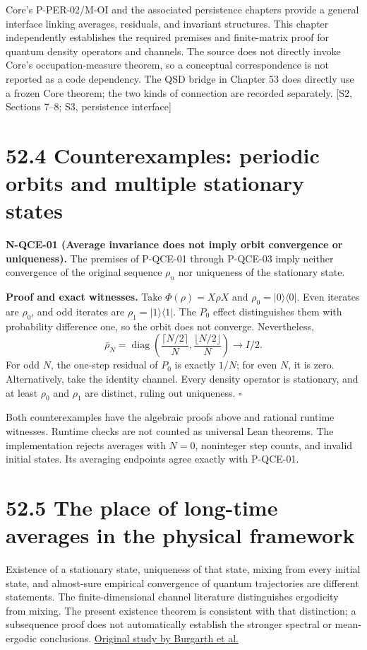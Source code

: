 \documentclass[
  11pt,
  oneside]{book}
\begin{document}
Core's P-PER-02/M-OI and the associated persistence chapters provide a
general interface linking averages, residuals, and invariant structures.
This chapter independently establishes the required premises and
finite-matrix proof for quantum density operators and channels. The
source does not directly invoke Core's occupation-measure theorem, so a
conceptual correspondence is not reported as a code dependency. The QSD
bridge in Chapter 53 does directly use a frozen Core theorem; the two
kinds of connection are recorded separately. {[}S2, Sections 7--8; S3,
persistence interface{]}

\section{52.4 Counterexamples: periodic orbits and multiple stationary
states}

\label{n-qce-01}{}

\textbf{N-QCE-01 (Average invariance does not imply orbit convergence or
uniqueness).} The premises of P-QCE-01 through P-QCE-03 imply neither
convergence of the original sequence \(\rho_n\) nor uniqueness of the
stationary state.

\textbf{Proof and exact witnesses.} Take \(\Phi(\rho)=X\rho X\) and
\(\rho_0=|0\rangle\langle0|\). Even iterates are \(\rho_0\), and odd
iterates are \(\rho_1=|1\rangle\langle1|\). The \(P_0\) effect
distinguishes them with probability difference one, so the orbit does
not converge. Nevertheless, \[
\bar\rho_N=\operatorname{diag}\left(\frac{\lceil N/2\rceil}{N},
\frac{\lfloor N/2\rfloor}{N}\right)\longrightarrow I/2.
\] For odd \(N\), the one-step residual of \(P_0\) is exactly \(1/N\);
for even \(N\), it is zero. Alternatively, take the identity channel.
Every density operator is stationary, and at least \(\rho_0\) and
\(\rho_1\) are distinct, ruling out uniqueness. \(\square\)

Both counterexamples have the algebraic proofs above and rational
runtime witnesses. Runtime checks are not counted as universal Lean
theorems. The implementation rejects averages with \(N=0\), noninteger
step counts, and invalid initial states. Its averaging endpoints agree
exactly with P-QCE-01.

\section{52.5 The place of long-time averages in the physical framework}

Existence of a stationary state, uniqueness of that state, mixing from
every initial state, and almost-sure empirical convergence of quantum
trajectories are different statements. The finite-dimensional channel
literature distinguishes ergodicity from mixing. The present existence
theorem is consistent with that distinction; a subsequence proof does
not automatically establish the stronger spectral or mean-ergodic
conclusions. \href{https://arxiv.org/abs/1210.5625}{Original study by
Burgarth et al.}
\end{document}
